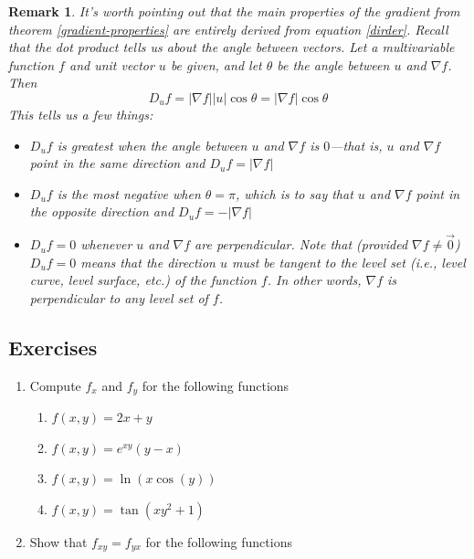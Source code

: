 \documentclass[12pt]{article}
\numberwithin{equation}{subsection}
\numberwithin{figure}{subsection}
\theoremstyle{note}
\newtheorem{remark}[subsection]{Remark}
\begin{document}
{\begin{remark}
	It's worth pointing out that the main properties of the gradient from theorem \ref{gradient-properties} are entirely derived from equation \eqref{dirder}. Recall that the dot product tells us about the angle between vectors. Let a multivariable function $f$ and unit vector $u$ be given, and let $\theta$ be the angle between $u$ and $\nabla f$. Then \begin{equation} D_u f = |\nabla f| |u| \cos \theta=|\nabla f | \cos \theta\end{equation}
	This tells us a few things: \begin{itemize}
		\item $D_u f$ is greatest when the angle between $u$ and $\nabla f$ is $0$---that is, $u$ and $\nabla f$ point in the same direction and $D_u f=|\nabla f|$
		\item $D_u f$ is the \textit{most negative} when $\theta=\pi$, which is to say that $u$ and $\nabla f$ point in the opposite direction and $D_uf=-|\nabla f|$
		\item $D_u f=0$ whenever $u$ and $\nabla f$ are perpendicular. Note that (provided $\nabla f\neq \vec 0$) $D_u f=0$ means that the direction $u$ must be tangent to the level set (i.e., level curve, level surface, etc.) of the function $f$. In other words, $\nabla f$ is perpendicular to any level set of $f$. 
	\end{itemize}

\end{remark}





\subsection{Exercises}
\begin{enumerate}[label=\arabic*.]
\item Compute $f_x$ and $f_y$ for the following functions

\begin{enumerate}
	\item $f(x,y)=2x+y$
	\item $f(x,y)=e^{xy}(y-x)$
	\item $f(x,y)=\ln(x\cos(y))$
	\item $f(x,y)=\tan(xy^2+1)$
\end{enumerate}


\item Show that $f_{xy}=f_{yx}$ for the following functions


\end{enumerate}}
\end{document}
